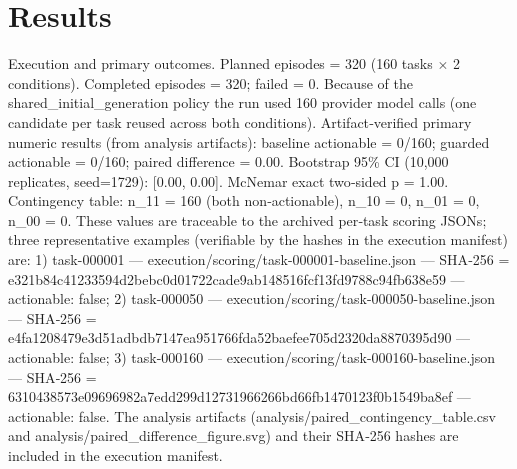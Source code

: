 \documentclass[conference]{IEEEtran}
\begin{document}
\section{Results}
Execution and primary outcomes. Planned episodes = 320 (160 tasks \ensuremath{\times} 2 conditions). Completed episodes = 320; failed = 0. Because of the shared\_initial\_generation policy the run used 160 provider model calls (one candidate per task reused across both conditions). Artifact‑verified primary numeric results (from analysis artifacts): baseline actionable = 0/160; guarded actionable = 0/160; paired difference = 0.00. Bootstrap 95\% CI (10,000 replicates, seed=1729): [0.00, 0.00]. McNemar exact two‑sided p = 1.00. Contingency table: n\_11 = 160 (both non‑actionable), n\_10 = 0, n\_01 = 0, n\_00 = 0. These values are traceable to the archived per‑task scoring JSONs; three representative examples (verifiable by the hashes in the execution manifest) are: 1) task-000001 --- execution/scoring/task-000001-baseline.json --- SHA‑256 = e321b84c41233594d2bebc0d01722cade9ab148516fcf13fd9788c94fb638e59 --- actionable: false; 2) task-000050 --- execution/scoring/task-000050-baseline.json --- SHA‑256 = e4fa1208479e3d51adbdb7147ea951766fda52baefee705d2320da8870395d90 --- actionable: false; 3) task-000160 --- execution/scoring/task-000160-baseline.json --- SHA‑256 = 6310438573e09696982a7edd299d12731966266bd66fb1470123f0b1549ba8ef --- actionable: false. The analysis artifacts (analysis/paired\_contingency\_table.csv and analysis/paired\_difference\_figure.svg) and their SHA‑256 hashes are included in the execution manifest.
\end{document}
